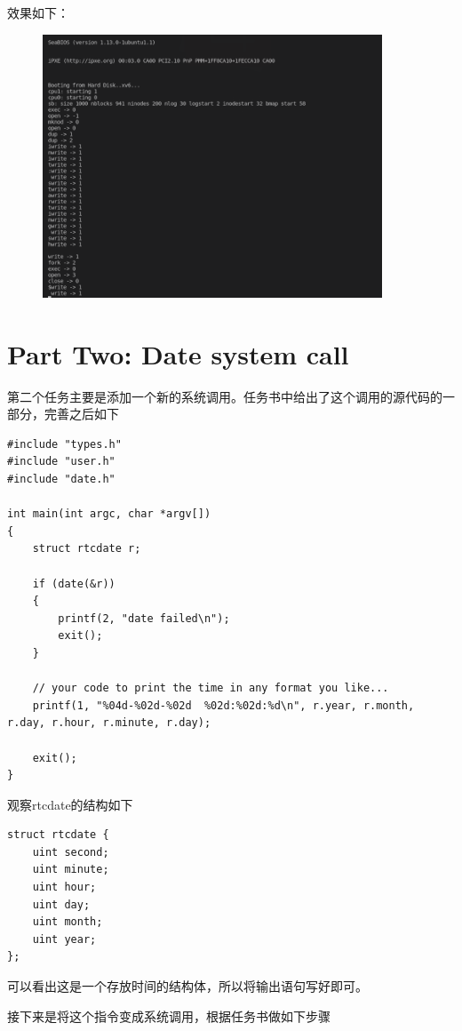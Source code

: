 \documentclass{article}
\begin{document}
效果如下：
\begin{figure}[H]
    \centering
    \includegraphics[width=0.9\textwidth]{sys_call.png}
\end{figure} 


\section{Part Two: Date system call}

第二个任务主要是添加一个新的系统调用。任务书中给出了这个调用的源代码的一部分，完善之后如下

\begin{lstlisting}
#include "types.h"
#include "user.h"
#include "date.h"

int main(int argc, char *argv[])
{
	struct rtcdate r;

	if (date(&r))
	{
		printf(2, "date failed\n");
		exit();
	}

	// your code to print the time in any format you like...
	printf(1, "%04d-%02d-%02d  %02d:%02d:%d\n", r.year, r.month, r.day, r.hour, r.minute, r.day);

	exit();
}
\end{lstlisting}

观察rtcdate的结构如下
\begin{lstlisting}
struct rtcdate {
	uint second;
	uint minute;
	uint hour;
	uint day;
	uint month;
	uint year;
};
\end{lstlisting}

可以看出这是一个存放时间的结构体，所以将输出语句写好即可。

接下来是将这个指令变成系统调用，根据任务书做如下步骤
\end{document}
